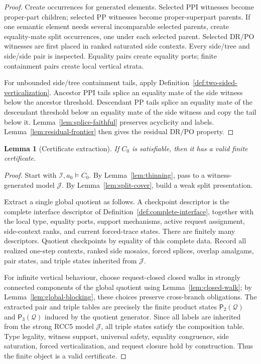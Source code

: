 \documentclass[11pt]{article}
\newtheorem{lemma}[theorem]{Lemma}
\newcommand{\PP}{\mathrm{PP}}
\newcommand{\PPI}{\mathrm{PPI}}
\newcommand{\DR}{\mathrm{DR}}
\newcommand{\PO}{\mathrm{PO}}
\newcommand{\I}{\mathcal I}
\newcommand{\J}{\mathcal J}
\newcommand{\Q}{\mathcal Q}
\newcommand{\Pairs}{\mathsf{P}_2}
\newcommand{\Triples}{\mathsf{P}_3}
\begin{document}
\begin{proof}
Create occurrences for generated elements.  Selected $\PPI$ witnesses become proper-part children; selected $\PP$ witnesses become proper-superpart parents.  If one semantic element needs several incomparable selected parents, create equality-mate split occurrences, one under each selected parent.  Selected $\DR/\PO$ witnesses are first placed in ranked saturated side contexts.  Every side/tree and side/side pair is inspected.  Equality pairs create equality ports; finite containment pairs create local vertical strata.

For unbounded side/tree containment tails, apply Definition~\ref{def:two-sided-verticalization}.  Ancestor $\PPI$ tails splice an equality mate of the side witness below the ancestor threshold.  Descendant $\PP$ tails splice an equality mate of the descendant threshold below an equality mate of the side witness and copy the tail below it.  Lemma~\ref{lem:splice-faithful} preserves acyclicity and labels.  Lemma~\ref{lem:residual-frontier} then gives the residual $\DR/\PO$ property.
\end{proof}

\begin{lemma}[Certificate extraction]
\label{lem:extraction}
If $C_0$ is satisfiable, then it has a valid finite certificate.
\end{lemma}

\begin{proof}
Start with $\I,a_0\models C_0$.  By Lemma~\ref{lem:thinning}, pass to a witness-generated model $\J$.  By Lemma~\ref{lem:split-cover}, build a weak split presentation.

Extract a single global quotient as follows.  A checkpoint descriptor is the complete interface descriptor of Definition~\ref{def:complete-interface}, together with the local type, equality ports, support mechanisms, active request assignment, side-context ranks, and current forced-trace states.  There are finitely many descriptors.  Quotient checkpoints by equality of this complete data.  Record all realized one-step contexts, ranked side mosaics, forced splices, overlap amalgams, pair states, and triple states inherited from $\J$.

For infinite vertical behaviour, choose request-closed closed walks in strongly connected components of the global quotient using Lemma~\ref{lem:closed-walk}; by Lemma~\ref{lem:global-blocking}, these choices preserve cross-branch obligations.  The extracted pair and triple tables are precisely the finite product states $\Pairs(\Q)$ and $\Triples(\Q)$ induced by the quotient generator.  Since all labels are inherited from the strong RCC5 model $\J$, all triple states satisfy the composition table.  Type legality, witness support, universal safety, equality congruence, side saturation, forced verticalization, and request closure hold by construction.  Thus the finite object is a valid certificate.
\end{proof}
\end{document}
